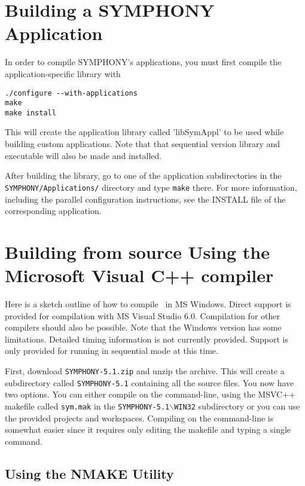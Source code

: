 \section{Building a SYMPHONY Application}

In order to compile SYMPHONY's applications, you must first compile the 
application-specific library with
{\color{Brown}
\begin{verbatim}
./configure --with-applications
make 
make install
\end{verbatim}
}
This will create the application library called 'libSymAppl' to be used while
building custom applications. Note that that sequential version library and
executable will also be made and installed.

After building the library, go to one of the application subdirectories in the
\texttt{SYMPHONY/Applications/} directory and type \texttt{make} there. For
more information, including the parallel configuration instructions, see the
INSTALL file of the corresponding application.

\section{Building from source Using the Microsoft Visual C++ compiler}
\label{getting_started_windows}

Here is a sketch outline of how to compile \BB\ in MS Windows. Direct support
is provided for compilation with MS Visual Studio 6.0. Compilation for other
compilers should also be possible. Note that the Windows version has some
limitations. Detailed timing information is not currently provided. Support is
only provided for running in sequential mode at this time.

First, download \texttt{SYMPHONY-5.1.zip} and unzip the archive. This will
create a subdirectory called \texttt{SYMPHONY-5.1} containing all the source
files. You now have two options. You can either compile on the command-line,
using the MSVC++ makefile called
\texttt{sym.mak} in the \texttt{SYMPHONY-5.1$\backslash$WIN32} subdirectory or 
you can use the provided projects and workspaces. Compiling on the command-line 
is somewhat easier since it requires only editing the makefile and typing a
single command.

\subsection{Using the NMAKE Utility}
\label{using_nmake}

